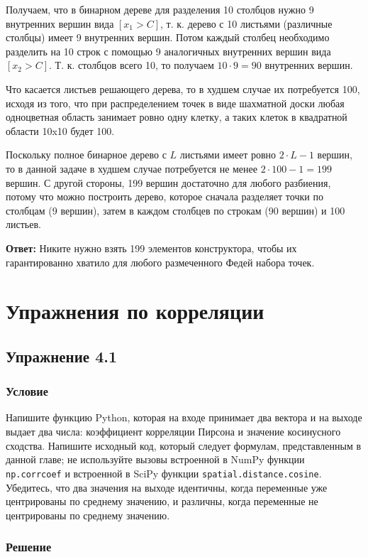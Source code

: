 \documentclass{article}
\begin{document}
Получаем, что в бинарном дереве для разделения 10 столбцов нужно 9 внутренних вершин вида $[x_1 > C]$, т. к. дерево с 10 листьями (различные столбцы) имеет 9 внутренних вершин. Потом каждый столбец необходимо разделить на 10 строк с помощью 9 аналогичных внутренних вершин вида $[x_2 > C]$. Т. к. столбцов всего 10, то получаем $10 \cdot 9 = 90$ внутренних вершин.

Что касается листьев решающего дерева, то в худшем случае их потребуется 100, исходя из того, что при распределением точек в виде шахматной доски любая одноцветная область занимает ровно одну клетку, а таких клеток в квадратной области 10x10 будет 100.

Поскольку полное бинарное дерево с $L$ листьями имеет ровно $2 \cdot L - 1$ вершин, то в данной задаче в худшем случае потребуется не менее $2 \cdot 100 - 1 = 199$ вершин. С другой стороны, 199 вершин достаточно для любого разбиения, потому что можно построить дерево, которое сначала разделяет точки по столбцам (9 вершин), затем в каждом столбцев по строкам (90 вершин) и 100 листьев.

\textbf{Ответ:} Никите нужно взять 199 элементов конструктора, чтобы их гарантированно хватило для любого размеченного Федей набора точек.

\section{Упражнения по корреляции}

\subsection*{Упражнение 4.1}

\subsubsection*{Условие}

Напишите функцию Python, которая на входе принимает два вектора и на выходе выдает два числа: коэффициент корреляции Пирсона и значение косинусного сходства. Напишите исходный код, который следует формулам, представленным в данной главе; не используйте вызовы встроенной в NumPy функции \texttt{np.corrcoef} и встроенной в SciPy функции \texttt{spatial.distance.cosine}. Убедитесь, что два значения на выходе идентичны, когда переменные уже центрированы по среднему значению, и различны, когда переменные не центрированы по среднему значению.

\subsubsection*{Решение}
\end{document}
